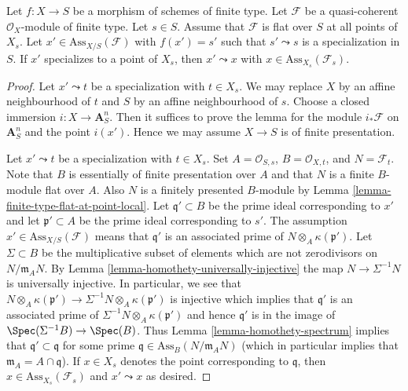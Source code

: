 \begin{lemma}
\label{lemma-associated-point-specializes}
Let $f : X \to S$ be a morphism of schemes of finite type.
Let $\mathcal{F}$ be a quasi-coherent $\mathcal{O}_X$-module of finite type.
Let $s \in S$.
Assume that $\mathcal{F}$ is flat over $S$ at all points of $X_s$.
Let $x' \in \text{Ass}_{X/S}(\mathcal{F})$ with $f(x') = s'$
such that $s' \leadsto s$ is a specialization in $S$. If
$x'$ specializes to a point of $X_s$, then $x' \leadsto x$
with $x \in \text{Ass}_{X_s}(\mathcal{F}_s)$.
\end{lemma}

\begin{proof}
Let $x' \leadsto t$ be a specialization with $t \in X_s$.
We may replace $X$ by an affine neighbourhood of $t$ and $S$ by an
affine neighbourhood of $s$. Choose a closed immersion
$i : X \to \mathbf{A}^n_S$. Then it suffices to prove the lemma
for the module $i_*\mathcal{F}$ on $\mathbf{A}^n_S$ and the point $i(x')$.
Hence we may assume $X \to S$ is of finite presentation.

\medskip\noindent
Let $x' \leadsto t$ be a specialization with $t \in X_s$.
Set $A = \mathcal{O}_{S, s}$, $B = \mathcal{O}_{X, t}$, and
$N = \mathcal{F}_t$. Note that $B$ is essentially of finite presentation
over $A$ and that $N$ is a finite $B$-module flat over $A$.
Also $N$ is a finitely presented $B$-module by
Lemma \ref{lemma-finite-type-flat-at-point-local}.
Let $\mathfrak q' \subset B$ be the prime ideal corresponding to $x'$
and let $\mathfrak p' \subset A$ be the prime ideal corresponding to $s'$.
The assumption $x' \in \text{Ass}_{X/S}(\mathcal{F})$ means that
$\mathfrak q'$ is an associated prime of $N \otimes_A \kappa(\mathfrak p')$.
Let $\Sigma \subset B$ be the multiplicative subset of elements which are
not zerodivisors on $N/\mathfrak m_A N$. By
Lemma \ref{lemma-homothety-universally-injective}
the map $N \to \Sigma^{-1}N$ is universally injective.
In particular, we see that
$N \otimes_A \kappa(\mathfrak p') \to
\Sigma^{-1}N \otimes_A \kappa(\mathfrak p')$
is injective which implies that $\mathfrak q'$ is an associated
prime of $\Sigma^{-1}N \otimes_A \kappa(\mathfrak p')$ and hence
$\mathfrak q'$ is in the image of
$\Spec(\Sigma^{-1}B) \to \Spec(B)$. Thus
Lemma \ref{lemma-homothety-spectrum}
implies that $\mathfrak q' \subset \mathfrak q$ for some prime
$\mathfrak q \in \text{Ass}_B(N/\mathfrak m_A N)$ (which in particular implies
that $\mathfrak m_A = A \cap \mathfrak q$). If $x \in X_s$
denotes the point corresponding to $\mathfrak q$, then
$x \in \text{Ass}_{X_s}(\mathcal{F}_s)$ and $x' \leadsto x$ as desired.
\end{proof}

